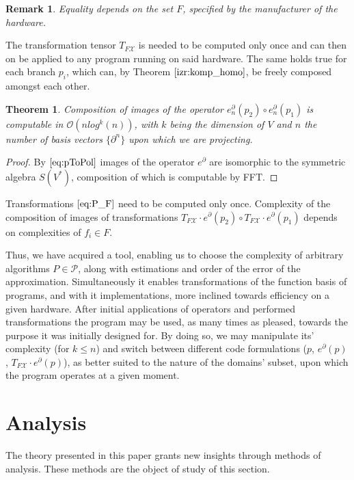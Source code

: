 \documentclass{article}
\newcommand{\X}{\mathcal{X}}
\newcommand{\dP}{\mathcal{P}}
\newcommand{\D}{\partial}
\newtheorem{izrek}{Theorem}[section]
\newtheorem{opomba}{Remark}[section]
\begin{document}
\begin{opomba}
Equality depends on the set $F$, specified by the manufacturer of the hardware.
\end{opomba}

The transformation tensor $T_{F\X}$ is needed to be computed only once and can then on be applied to any program running on said hardware. The same holds true for each branch $p_i$, which can, by Theorem $\ref{izr:komp_homo}$, be freely composed amongst each other.

\begin{izrek}
Composition of images of the operator $e_n^\D(p_2)\circ e_n^\D(p_1)$ is computable in $\mathcal{O}(nlog^k(n))$, with $k$ being the dimension of $V$ and $n$ the number of basis vectors $\{\D^n\}$ upon which we are projecting.
\end{izrek}

\begin{proof}
	By $\eqref{eq:pToPol}$ images of the operator $e^\D$ are isomorphic to the symmetric algebra $S(V^*)$, composition of which is computable by FFT.
\end{proof}

Transformations $\eqref{eq:P_F}$ need to be computed only once. Complexity of the composition of images of transformations $T_{F\X}\cdot e^\D(p_2)\circ T_{F\X}\cdot e^\D(p_1)$ depends on complexities of $f_i\in F$.

Thus, we have acquired a tool, enabling us to choose the complexity of arbitrary algorithms $P\in\dP$, along with estimations and order of the error of the approximation. Simultaneously it enables transformations of the function basis of programs, and with it implementations, more inclined towards efficiency on a given hardware. After initial applications of operators and performed transformations the program may be used, as many times as pleased, towards the purpose it was initially designed for. By doing so, we may manipulate its' complexity (for $k\le n$) and switch between different code formulations ($p$, $e^\D(p)$, $T_{F\X}\cdot e^\D(p)$), as better suited to the nature of the domains' subset, upon which the program operates at a given moment.
  
\section{Analysis}
  
   The theory presented in this paper grants new insights through methods of analysis.  These methods are the object of study of this section.
  
\end{document}
